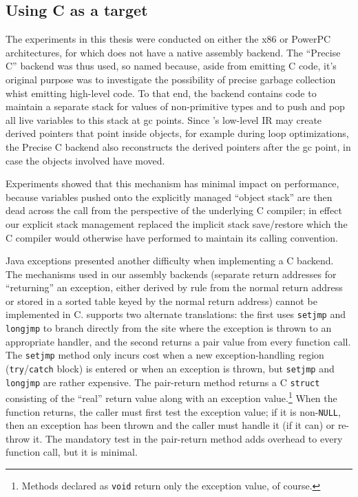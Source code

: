 \subsection*{Using C as a target}\label{sec:precisec}
The experiments in this thesis were conducted on either the x86 or
PowerPC architectures, for which \flex does not have a native assembly
backend.  The ``Precise C'' backend was thus used, so named because,
aside from emitting C code, it's original purpose was to investigate
the possibility of precise garbage collection whist emitting
high-level code.  To that end, the backend contains code to maintain a
separate stack for values of non-primitive types and to push and pop
all live variables to this stack at gc points.  Since \flex's low-level
IR may create derived pointers that point inside objects, for example
during loop optimizations, the Precise C backend also reconstructs
the derived pointers after the gc point, in case the objects involved
have moved.\label{sec:precise-gc}

Experiments showed that this mechanism has minimal impact on
performance, because variables pushed onto the explicitly managed
``object stack'' are then dead across the call from the perspective
of the underlying C compiler; in effect our explicit stack management
replaced the implicit stack save/restore which the C compiler would
otherwise have performed to maintain its calling convention.

Java exceptions presented another difficulty when implementing a C
backend.  The mechanisms used in our assembly backends (separate
return addresses for ``returning'' an exception, either derived by
rule from the normal return address or stored in a sorted table keyed
by the normal return address) cannot be implemented in C.  \Flex supports
two alternate translations: the first uses \texttt{setjmp} and
\texttt{longjmp} to branch directly from the site where the exception
is thrown to an appropriate handler, and the second returns a pair
value from every function call.  The \texttt{setjmp} method only
incurs cost when a new exception-handling region
(\texttt{try}/\texttt{catch} block) is entered or when an exception
is thrown, but \texttt{setjmp} and \texttt{longjmp} are rather
expensive.  The pair-return method returns a C \texttt{struct}
consisting of the ``real'' return value along with an exception
value.\footnote{Methods declared as \texttt{void} return only the
  exception value, of course.}  When the function returns, the caller
must first test the exception value; if it is non-\texttt{NULL}, then
an exception has been thrown and the caller must handle it (if it can)
or re-throw it.
The mandatory test in the pair-return method adds overhead to every
function call, but it is minimal.  

